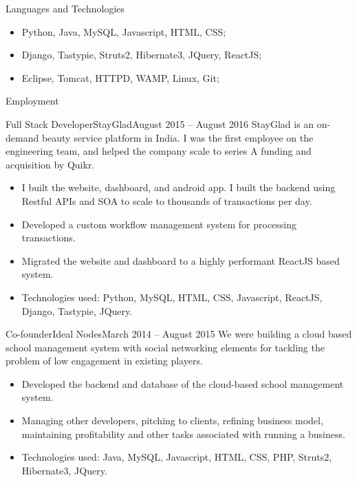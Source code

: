 \documentclass[]{mcdowellcv}
\begin{document}
	\makeheader

	\begin{cvsection}{Languages and Technologies}
		\begin{cvsubsection}{}{}{}	
			\begin{itemize}
				\item Python, Java, MySQL, Javascript, HTML, CSS;
				\item Django, Tastypie, Struts2, Hibernate3, JQuery, ReactJS;
				\item Eclipse, Tomcat, HTTPD, WAMP, Linux, Git;
			\end{itemize}
		\end{cvsubsection}
	\end{cvsection}
	
	\begin{cvsection}{Employment}
		\begin{cvsubsection}{Full Stack Developer}{StayGlad}{August 2015 – August 2016}
			StayGlad is an on-demand beauty service platform in India. I was the first employee on the engineering team, and helped the company scale to series A funding and acquisition by Quikr.
			\begin{itemize}
				\item I built the website, dashboard, and android app. I built the backend using Restful APIs and SOA to scale to thousands of transactions per day.
				\item Developed a custom workflow management system for processing transactions.
				\item Migrated the website and dashboard to a highly performant ReactJS based system.
				\item Technologies used: Python, MySQL, HTML, CSS, Javascript, ReactJS, Django, Tastypie, JQuery.
			\end{itemize}
		\end{cvsubsection}
		
		\begin{cvsubsection}{Co-founder}{Ideal Nodes}{March 2014 – August 2015}	
			We were building a cloud based school management system with social networking elements for tackling the problem of low engagement in existing players.
			\begin{itemize}
				\item Developed the backend and database of the cloud-based school management system.
				\item Managing other developers, pitching to clients, refining business model, maintaining profitability and other tasks associated with running a business.
				\item Technologies used: Java, MySQL, Javascript, HTML, CSS, PHP, Struts2, Hibernate3, JQuery.
			\end{itemize}
		\end{cvsubsection}
		

\end{cvsection}
\end{document}
